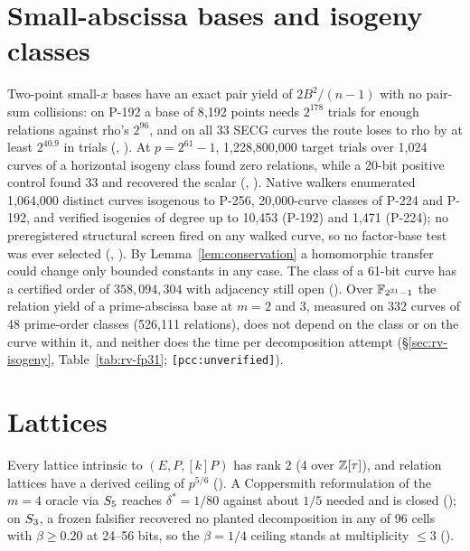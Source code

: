 \section{Small-abscissa bases and isogeny classes}

Two-point small-$x$ bases have an exact pair yield of $2B^2/(n-1)$ with no
pair-sum collisions: on P-192 a base of 8{,}192 points needs $2^{178}$ trials
for enough relations against rho's $2^{96}$, and on all 33 SECG curves the
route loses to rho by at least $2^{40.9}$ in trials
(,
). At $p=2^{61}-1$, 1{,}228{,}800{,}000
target trials over 1{,}024 curves of a horizontal isogeny class found zero
relations, while a 20-bit positive control found 33 and recovered the
scalar (,
). Native walkers enumerated
1{,}064{,}000 distinct curves isogenous to P-256, 20{,}000-curve classes of
P-224 and P-192, and verified isogenies of degree up to 10{,}453 (P-192) and
1{,}471 (P-224); no preregistered structural screen fired on any walked
curve, so no factor-base test was ever selected
(,
). By
Lemma~\ref{lem:conservation} a homomorphic transfer could change only
bounded constants in any case. The class of a 61-bit curve has a
certified order of $358{,}094{,}304$ with adjacency still open
(). Over $\mathbb{F}_{2^{31}-1}$ the
relation yield of a prime-abscissa base at $m=2$ and 3, measured on 332
curves of 48 prime-order classes (526{,}111 relations), does not depend on
the class or on the curve within it, and neither does the time per
decomposition attempt (\S\ref{sec:rv-isogeny}, Table~\ref{tab:rv-fp31};
\texttt{[pcc:unverified]}).

\section{Lattices}

Every lattice intrinsic to $(E,P,[k]P)$ has rank 2 (4 over $\mathbb{Z}[\tau]$), and
relation lattices have a derived ceiling of $p^{5/6}$
().
A Coppersmith reformulation of the $m=4$ oracle via $S_{5}$ reaches
$\delta^*=1/80$ against about $1/5$ needed and is closed
(); on $S_{3}$, a
frozen falsifier recovered no planted decomposition in any of 96 cells with
$\beta\ge0.20$ at 24--56 bits, so the $\beta=1/4$ ceiling stands at
multiplicity $\le3$ ().

